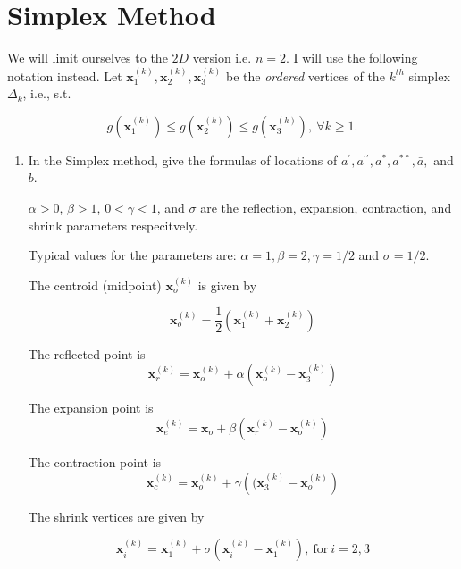 \documentclass[11pt,oneside]{extarticle}
\newcommand{\dprime}{{\prime\prime}}
\newcommand{\vect}[1]{\boldsymbol{#1}}
\begin{document}
\newpage

\section{Simplex Method}

We will limit ourselves to the $2D$ version i.e. $n=2$.
I will use the following notation instead. Let $\vect{x}_1^{(k)}, 
\vect{x}_2^{(k)}, \vect{x}_3^{(k)}$ be the \emph{ordered} vertices of the $k^{th}$
    simplex $\Delta_k$, i.e., s.t.

    $$g( \vect{x}_1^{(k)} ) \leq g( \vect{x}_2^{(k)} ) \leq g( \vect{x}_3^{(k)} ),\:
    \forall k \geq 1.$$


    \begin{enumerate}


        \item In the Simplex method, give the formulas of locations of
            $a^\prime, a^\dprime, a^*, a^{**}, \bar{a},$ and $\bar{b}$.
   
            $\alpha > 0$, $\beta > 1$, $0 < \gamma < 1$, and $\sigma$ are 
            the reflection, expansion, contraction, and shrink parameters 
            respecitvely.

            Typical values for the parameters are: $\alpha=1,\beta=2,\gamma=1/2$ 
            and $\sigma=1/2$.

            The centroid (midpoint) $\vect{x}_o^{(k)}$ is given by

            $$\vect{x}_o^{(k)} = 
            \frac{1}{2}\left( \vect{x}_1^{(k)} + \vect{x}_2^{(k)}\right)
            $$

            The reflected point is
            $$\vect{x}_r^{(k)} =
            \vect{x}_o^{(k)} + \alpha\left(
            \vect{x}_o^{(k)} - \vect{x}_3^{(k)}\right)
            $$

            The expansion point is
            $$
            \vect{x}_e^{(k)} =
            \vect{x}_o + \beta\left( \vect{x}_r^{(k)} - \vect{x}_o^{(k)}
            \right)
            $$

            The contraction point is
            $$
            \vect{x}_c^{(k)} =
            \vect{x}_o^{(k)} + \gamma\left(
            ( \vect{x}_3^{(k)} - \vect{x}_o^{(k)}
            \right)
            $$

            The shrink vertices are given by

            $$
            \vect{x}_i^{(k)} = \vect{x}_1^{(k)} + \sigma\left(
            \vect{x}_i^{(k)} - \vect{x}_1^{(k)}
            \right),\: \mathrm{for}\: i=2,3
            $$


\end{enumerate}
\end{document}
